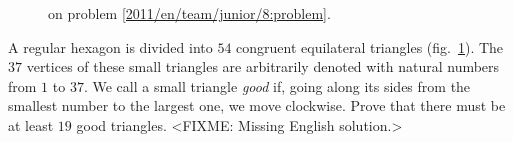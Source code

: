 \ifproblem
\begin{figure}\centering
    \caption{on problem \ref{2011/en/team/junior/8:problem}.}
    \label{2011/en/team/junior/8:problem:fig}
\end{figure}%
\fi %

\problem{}
\label{2011/en/team/junior/8:problem}%
A regular hexagon is divided into $54$ congruent equilateral triangles
(fig.~\ref{2011/en/team/junior/8:problem:fig}).
The $37$ vertices of these small triangles are arbitrarily denoted with natural
numbers from $1$ to $37$.
We call a small triangle \emph{good} if, going along its sides from the
smallest number to the largest one, we move clockwise.
Prove that there must be at least $19$ good triangles.
\solution
<FIXME: Missing English solution.>
\endproblem
